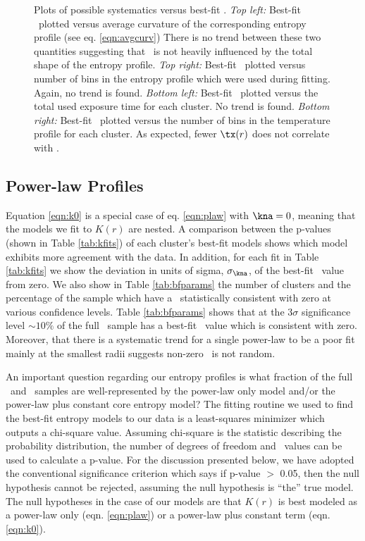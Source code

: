 \begin{center}
\begin{figure}[htp]
\begin{minipage}[htp]{0.5\linewidth}
    \end{minipage}
    \caption[Plots of possible systematics versus best-fit \kna.]{Plots of possible systematics versus best-fit \kna.
      {\it{Top left:}} Best-fit \kna\ plotted versus average curvature
      of the corresponding entropy profile (see eq. \ref{eqn:avgcurv})
      There is no trend between these two quantities suggesting that
      \kna\ is not heavily influenced by the total shape of the
      entropy profile. {\it{Top right:}} Best-fit \kna\ plotted versus
      number of bins in the entropy profile which were used during
      fitting. Again, no trend is found. {\it{Bottom left:}} Best-fit
      \kna\ plotted versus the total used exposure time for each
      cluster. No trend is found. {\it{Bottom right:}} Best-fit
      \kna\ plotted versus the number of bins in the temperature
      profile for each cluster. As expected, fewer $\tx(r)$ does not
      correlate with \kna.}
    \label{fig:sys}
  \end{figure}
\end{center}

\subsection{Power-law Profiles}
\label{sec:entsuppquality}

Equation \ref{eqn:k0} is a special case of eq. \ref{eqn:plaw} with
$\kna = 0$, meaning that the models we fit to $K(r)$ are nested. A
comparison between the p-values (shown in Table \ref{tab:kfits}) of
each cluster's best-fit models shows which model exhibits more
agreement with the data. In addition, for each fit in Table
\ref{tab:kfits} we show the deviation in units of sigma,
$\sigma_{\kna}$, of the best-fit \kna\ value from zero. We also show
in Table \ref{tab:bfparams} the number of clusters and the percentage
of the sample which have a \kna\ statistically consistent with zero at
various confidence levels. Table \ref{tab:bfparams} shows that at the
$3\sigma$ significance level $\sim10\%$ of the full \accept\ sample
has a best-fit \kna\ value which is consistent with zero. Moreover,
that there is a systematic trend for a single power-law to be a poor
fit mainly at the smallest radii suggests non-zero \kna\ is not
random.

An important question regarding our entropy profiles is what fraction
of the full \accept\ and \hifl\ samples are well-represented by the
power-law only model and/or the power-law plus constant core entropy
model? The fitting routine we used to find the best-fit entropy models
to our data is a least-squares minimizer which outputs a chi-square
value. Assuming chi-square is the statistic describing the probability
distribution, the number of degrees of freedom and \chisq\ values can
be used to calculate a p-value. For the discussion presented below, we
have adopted the conventional significance criterion which says if
p-value $>$ 0.05, then the null hypothesis cannot be rejected, assuming
the null hypothesis is ``the'' true model. The null hypotheses in the
case of our models are that $K(r)$ is best modeled as a power-law only
(eqn. \ref{eqn:plaw}) or a power-law plus constant term
(eqn. \ref{eqn:k0}).

